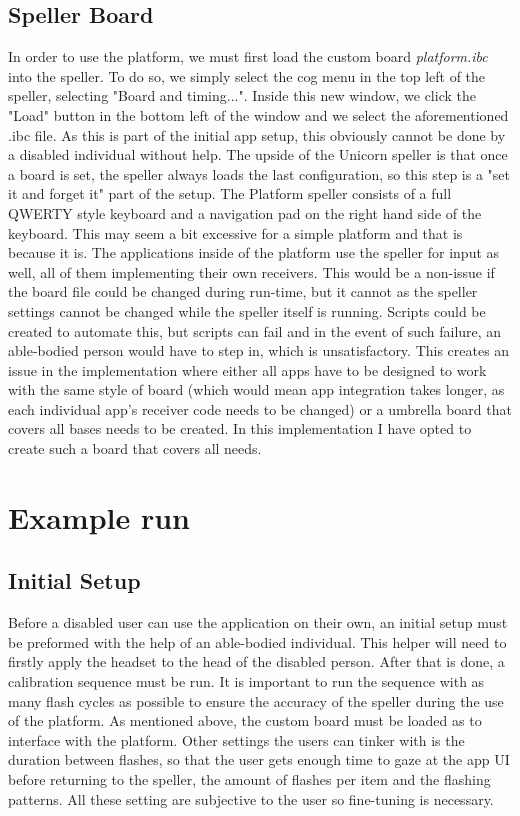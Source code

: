 \subsection{Speller Board}
In order to use the platform, we must first load the custom board \textit{platform.ibc} into the speller. To do so, we simply select the cog menu in the top left of the speller, selecting "Board and timing...". Inside this new window, we click the "Load" button in the bottom left of the window and we select the aforementioned .ibc file. As this is part of the initial app setup, this obviously cannot be done by a disabled individual without help. The upside of the Unicorn speller is that once a board is set, the speller always loads the last configuration, so this step is a "set it and forget it" part of the setup.
\vspace{\baselineskip}\newline
The Platform speller consists of a full QWERTY style keyboard and a navigation pad on the right hand side of the keyboard. This may seem a bit excessive for a simple platform and that is because it is. The applications inside of the platform use the speller for input as well, all of them implementing their own receivers. This would be a non-issue if the board file could be changed during run-time, but it cannot as the speller settings cannot be changed while the speller itself is running. Scripts could be created to automate this, but scripts can fail and in the event of such failure, an able-bodied person would have to step in, which is unsatisfactory. This creates an issue in the implementation where either all apps have to be designed to work with the same style of board (which would mean app integration takes longer, as each individual app's receiver code needs to be changed) or a umbrella board that covers all bases needs to be created. In this implementation I have opted to create such a board that covers all needs.



\section{Example run}
\subsection{Initial Setup}
Before a disabled user can use the application on their own, an initial setup must be preformed with the help of an able-bodied individual. This helper will need to firstly apply the headset to the head of the disabled person. After that is done, a calibration sequence must be run. It is important to run the sequence with as many flash cycles as possible to ensure the accuracy of the speller during the use of the platform. As mentioned above, the custom board must be loaded as to interface with the platform. Other settings the users can tinker with is the duration between flashes, so that the user gets enough time to gaze at the app UI before returning to the speller, the amount of flashes per item and the flashing patterns. All these setting are subjective to the user so fine-tuning is necessary.
